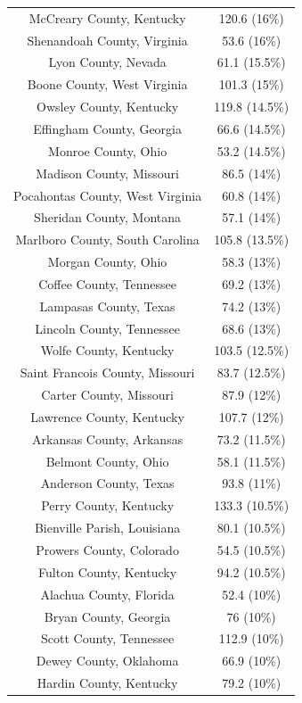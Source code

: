\begin{table}[ht]
\begin{tabular}{cc}
  McCreary County, Kentucky & 120.6 (16\%) \\ 
  Shenandoah County, Virginia & 53.6 (16\%) \\ 
  Lyon County, Nevada & 61.1 (15.5\%) \\ 
  Boone County, West Virginia & 101.3 (15\%) \\ 
  Owsley County, Kentucky & 119.8 (14.5\%) \\ 
  Effingham County, Georgia & 66.6 (14.5\%) \\ 
  Monroe County, Ohio & 53.2 (14.5\%) \\ 
  Madison County, Missouri & 86.5 (14\%) \\ 
  Pocahontas County, West Virginia & 60.8 (14\%) \\ 
  Sheridan County, Montana & 57.1 (14\%) \\ 
  Marlboro County, South Carolina & 105.8 (13.5\%) \\ 
  Morgan County, Ohio & 58.3 (13\%) \\ 
  Coffee County, Tennessee & 69.2 (13\%) \\ 
  Lampasas County, Texas & 74.2 (13\%) \\ 
  Lincoln County, Tennessee & 68.6 (13\%) \\ 
  Wolfe County, Kentucky & 103.5 (12.5\%) \\ 
  Saint Francois County, Missouri & 83.7 (12.5\%) \\ 
  Carter County, Missouri & 87.9 (12\%) \\ 
  Lawrence County, Kentucky & 107.7 (12\%) \\ 
  Arkansas County, Arkansas & 73.2 (11.5\%) \\ 
  Belmont County, Ohio & 58.1 (11.5\%) \\ 
  Anderson County, Texas & 93.8 (11\%) \\ 
  Perry County, Kentucky & 133.3 (10.5\%) \\ 
  Bienville Parish, Louisiana & 80.1 (10.5\%) \\ 
  Prowers County, Colorado & 54.5 (10.5\%) \\ 
  Fulton County, Kentucky & 94.2 (10.5\%) \\ 
  Alachua County, Florida & 52.4 (10\%) \\ 
  Bryan County, Georgia & 76 (10\%) \\ 
  Scott County, Tennessee & 112.9 (10\%) \\ 
  Dewey County, Oklahoma & 66.9 (10\%) \\ 
  Hardin County, Kentucky & 79.2 (10\%) \\ 

\end{tabular}
\end{table}
